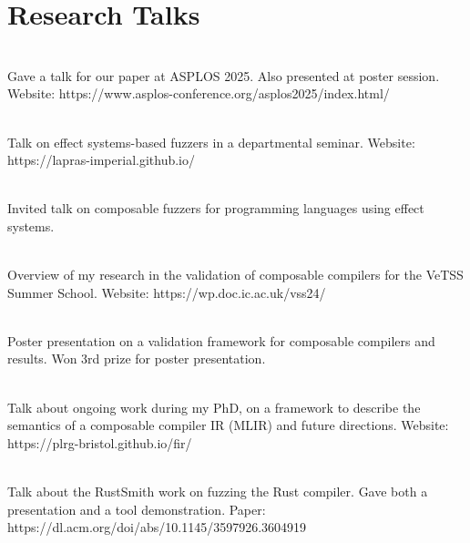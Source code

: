 \documentclass[]{deedy-resume-openfont}
\begin{document}
%
%
\section{Research Talks}
\raggedright
{}\hfill {}\\
Gave a talk for our paper at ASPLOS 2025. Also presented at poster session. Website: https://www.asplos-conference.org/asplos2025/index.html/\\
\sectionsep

\hfill {}\\
Talk on effect systems-based fuzzers in a departmental seminar. Website: https://lapras-imperial.github.io/\\
\sectionsep

\hfill {}\\
Invited talk on composable fuzzers for programming languages using effect systems.\\
\sectionsep

\hfill {}\\
Overview of my research in the validation of composable compilers for the VeTSS Summer School. Website: https://wp.doc.ic.ac.uk/vss24/\\
\sectionsep

\hfill {}\\
Poster presentation on a validation framework for composable compilers and results. Won 3rd prize for poster presentation. \\
\sectionsep

\hfill {}\\
Talk about ongoing work during my PhD, on a framework to describe the semantics of a composable compiler IR (MLIR) and future directions. Website: https://plrg-bristol.github.io/fir/\\
\sectionsep

\hfill {}\\
Talk about the RustSmith work on fuzzing the Rust compiler. Gave both a presentation and a tool demonstration. Paper: https://dl.acm.org/doi/abs/10.1145/3597926.3604919 \\
\sectionsep
\end{document}
